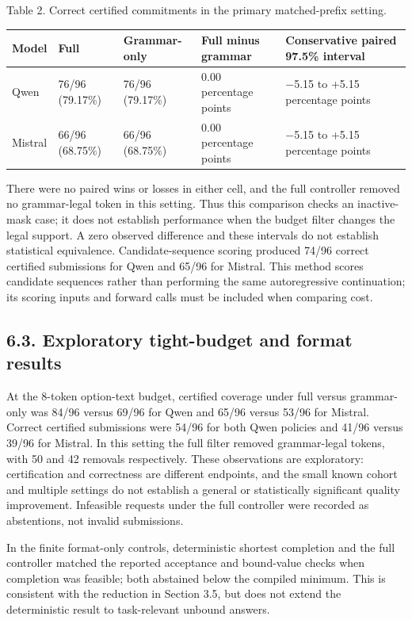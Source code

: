 \documentclass[
  12pt,
  a4paper,
]{article}
\begin{document}
Table 2. Correct certified commitments in the primary matched-prefix setting.

\begin{longtable}{@{}p{.11\linewidth}p{.15\linewidth}p{.16\linewidth}p{.17\linewidth}p{.29\linewidth}@{}}
\toprule
Model & Full & Grammar-only & Full minus grammar & Conservative paired 97.5\% interval \\
\midrule
\endhead
Qwen & 76/96 (79.17\%) & 76/96 (79.17\%) & 0.00 percentage points & $-$5.15 to +5.15 percentage points \\
Mistral & 66/96 (68.75\%) & 66/96 (68.75\%) & 0.00 percentage points & $-$5.15 to +5.15 percentage points \\
\bottomrule
\end{longtable}

There were no paired wins or losses in either cell, and the full controller removed no grammar-legal token in this setting. Thus this comparison checks an inactive-mask case; it does not establish performance when the budget filter changes the legal support. A zero observed difference and these intervals do not establish statistical equivalence. Candidate-sequence scoring produced 74/96 correct certified submissions for Qwen and 65/96 for Mistral. This method scores candidate sequences rather than performing the same autoregressive continuation; its scoring inputs and forward calls must be included when comparing cost.

\subsection{6.3. Exploratory tight-budget and format results}

At the 8-token option-text budget, certified coverage under full versus grammar-only was 84/96 versus 69/96 for Qwen and 65/96 versus 53/96 for Mistral. Correct certified submissions were 54/96 for both Qwen policies and 41/96 versus 39/96 for Mistral. In this setting the full filter removed grammar-legal tokens, with 50 and 42 removals respectively. These observations are exploratory: certification and correctness are different endpoints, and the small known cohort and multiple settings do not establish a general or statistically significant quality improvement. Infeasible requests under the full controller were recorded as abstentions, not invalid submissions.

In the finite format-only controls, deterministic shortest completion and the full controller matched the reported acceptance and bound-value checks when completion was feasible; both abstained below the compiled minimum. This is consistent with the reduction in Section 3.5, but does not extend the deterministic result to task-relevant unbound answers.
\end{document}
